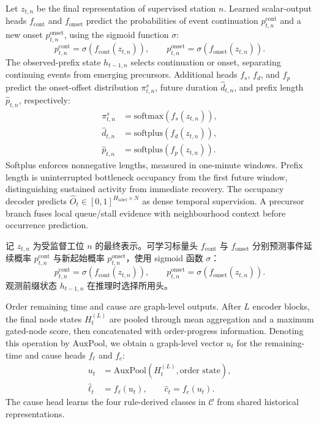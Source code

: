 \documentclass[a4paper,fleqn]{cas-dc}
\newcommand{\zhpara}[1]{%
  \par\begingroup\small\color{black!72}\noindent #1\par\endgroup}
\begin{document}
Let $z_{t,n}$ be the final representation of supervised station $n$. Learned scalar-output heads $f_{\mathrm{cont}}$ and $f_{\mathrm{onset}}$ predict the probabilities of event continuation $p^{\mathrm{cont}}_{t,n}$ and a new onset $p^{\mathrm{onset}}_{t,n}$, using the sigmoid function $\sigma$:
\begin{equation}
p^{\mathrm{cont}}_{t,n}=\sigma(f_{\mathrm{cont}}(z_{t,n})),
\qquad
p^{\mathrm{onset}}_{t,n}=\sigma(f_{\mathrm{onset}}(z_{t,n})).
\end{equation}
The observed-prefix state $h_{t-1,n}$ selects continuation or onset, separating continuing events from emerging precursors. Additional heads $f_s$, $f_d$, and $f_p$ predict the onset-offset distribution $\pi^s_{t,n}$, future duration $\hat d_{t,n}$, and prefix length $\hat p_{t,n}$, respectively:
\begin{equation}
\begin{aligned}
\pi^s_{t,n}&=\mathrm{softmax}(f_s(z_{t,n})),\\
\hat d_{t,n}&=\mathrm{softplus}(f_d(z_{t,n})),\\
\hat p_{t,n}&=\mathrm{softplus}(f_p(z_{t,n})).
\end{aligned}
\end{equation}
Softplus enforces nonnegative lengths, measured in one-minute windows. Prefix length is uninterrupted bottleneck occupancy from the first future window, distinguishing sustained activity from immediate recovery.
The occupancy decoder predicts $\hat O_t\in[0,1]^{H_{\mathrm{label}}\times N}$ as dense temporal supervision. A precursor branch fuses local queue/stall evidence with neighbourhood context before occurrence prediction.

\zhpara{记 $z_{t,n}$ 为受监督工位 $n$ 的最终表示。可学习标量头 $f_{\mathrm{cont}}$ 与 $f_{\mathrm{onset}}$ 分别预测事件延续概率 $p^{\mathrm{cont}}_{t,n}$ 与新起始概率 $p^{\mathrm{onset}}_{t,n}$，使用 sigmoid 函数 $\sigma$：
\begin{equation}
p^{\mathrm{cont}}_{t,n}=\sigma(f_{\mathrm{cont}}(z_{t,n})),
\qquad
p^{\mathrm{onset}}_{t,n}=\sigma(f_{\mathrm{onset}}(z_{t,n})).
\end{equation}
观测前缀状态 $h_{t-1,n}$ 在推理时选择所用头。}


Order remaining time and cause are graph-level outputs. After $L$ encoder blocks, the final node states $H_t^{(L)}$ are pooled through mean aggregation and a maximum gated-node score, then concatenated with order-progress information. Denoting this operation by $\mathrm{AuxPool}$, we obtain a graph-level vector $u_t$ for the remaining-time and cause heads $f_\ell$ and $f_c$:
\begin{equation}
\begin{aligned}
u_t&=\mathrm{AuxPool}(H_t^{(L)},\text{order state}),\\
\hat\ell_t&=f_\ell(u_t),\qquad \hat c_t=f_c(u_t).
\end{aligned}
\end{equation}
The cause head learns the four rule-derived classes in $\mathcal{C}$ from shared historical representations.
\end{document}

